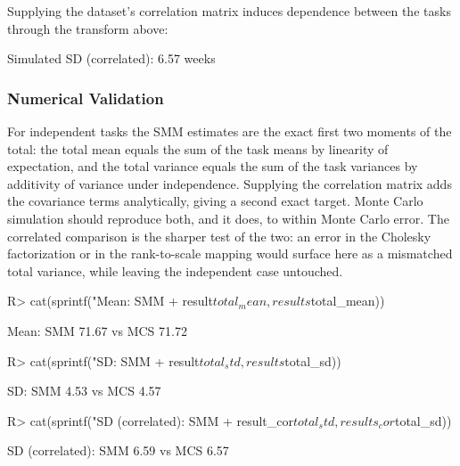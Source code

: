 \documentclass[
]{jss}
\begin{document}
Supplying the dataset's correlation matrix induces dependence between
the tasks through the transform above:

\begin{CodeChunk}
\begin{CodeOutput}
Simulated SD (correlated): 6.57 weeks
\end{CodeOutput}
\end{CodeChunk}

\subsubsection{Numerical Validation}\label{numerical-validation}

For independent tasks the SMM estimates are the exact first two moments
of the total: the total mean equals the sum of the task means by
linearity of expectation, and the total variance equals the sum of the
task variances by additivity of variance under independence. Supplying
the correlation matrix adds the covariance terms analytically, giving a
second exact target. Monte Carlo simulation should reproduce both, and
it does, to within Monte Carlo error. The correlated comparison is the
sharper test of the two: an error in the Cholesky factorization or in
the rank-to-scale mapping would surface here as a mismatched total
variance, while leaving the independent case untouched.

\begin{CodeChunk}
\begin{CodeInput}
R> cat(sprintf("Mean:            SMM %
+             result$total_mean, results$total_mean))
\end{CodeInput}
\begin{CodeOutput}
Mean:            SMM 71.67  vs  MCS 71.72
\end{CodeOutput}
\begin{CodeInput}
R> cat(sprintf("SD:              SMM %
+             result$total_std,  results$total_sd))
\end{CodeInput}
\begin{CodeOutput}
SD:              SMM 4.53  vs  MCS 4.57
\end{CodeOutput}
\begin{CodeInput}
R> cat(sprintf("SD (correlated): SMM %
+             result_cor$total_std, results_cor$total_sd))
\end{CodeInput}
\begin{CodeOutput}
SD (correlated): SMM 6.59  vs  MCS 6.57
\end{CodeOutput}
\end{CodeChunk}
\end{document}
